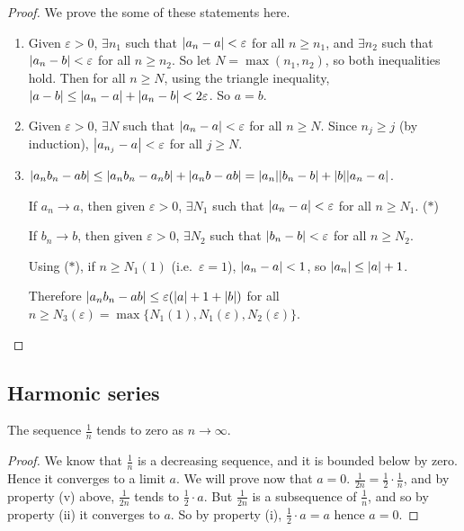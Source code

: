 \begin{proof}
	We prove the some of these statements here.
	\begin{enumerate}
		\item Given \(\varepsilon > 0\), \(\exists n_1\) such that \(\abs{a_n - a} < \varepsilon\) for all \(n \geq n_1\), and \(\exists n_2\) such that \(\abs{a_n - b} < \varepsilon\) for all \(n \geq n_2\).
		      So let \(N = \max(n_1, n_2)\), so both inequalities hold.
		      Then for all \(n \geq N\), using the triangle inequality, \(\abs{a - b} \leq \abs{a_n - a} + \abs{a_n - b} < 2\varepsilon\).
		      So \(a=b\).
		\item Given \(\varepsilon > 0\), \(\exists N\) such that \(\abs{a_n - a} < \varepsilon\) for all \(n \geq N\).
		      Since \(n_j \geq j\) (by induction), \(\abs{a_{n_j} - a} < \varepsilon\) for all \(j \geq N\).
		      \setcounter{enumi}{4}
		\item \(\abs{a_n b_n - ab} \leq \abs{a_n b_n - a_n b} + \abs{a_n b - ab} = \abs{a_n}\abs{b_n - b} + \abs{b}\abs{a_n - a}\).

		      If \(a_n \to a\), then given \(\varepsilon > 0\), \(\exists N_1\) such that \(\abs{a_n - a} < \varepsilon\) for all \(n \geq N_1\).
		      (\(\ast\))

		      If \(b_n \to b\), then given \(\varepsilon > 0\), \(\exists N_2\) such that \(\abs{b_n - b} < \varepsilon\) for all \(n \geq N_2\).

		      Using (\(\ast\)), if \(n \geq N_1(1)\) (i.e.\ \(\varepsilon = 1\)), \(\abs{a_n - a} < 1\), so \(\abs{a_n} \leq \abs{a} + 1\).

		      Therefore \(\abs{a_n b_n - ab} \leq \varepsilon(\abs{a} + 1 + \abs{b})\) for all \(n \geq N_3(\varepsilon) = \max\{ N_1(1), N_1(\varepsilon), N_2(\varepsilon) \}\).
	\end{enumerate}
\end{proof}

\subsection{Harmonic series}
\begin{lemma}
	The sequence \(\frac{1}{n}\) tends to zero as \(n \to \infty\).
\end{lemma}
\begin{proof}
	We know that \(\frac{1}{n}\) is a decreasing sequence, and it is bounded below by zero.
	Hence it converges to a limit \(a\).
	We will prove now that \(a = 0\).
	\(\frac{1}{2n} = \frac{1}{2}\cdot \frac{1}{n}\), and by property (v) above, \(\frac{1}{2n}\) tends to \(\frac{1}{2}\cdot a\).
	But \(\frac{1}{2n}\) is a subsequence of \(\frac{1}{n}\), and so by property (ii) it converges to \(a\).
	So by property (i), \(\frac{1}{2} \cdot a = a\) hence \(a=0\).
\end{proof}

